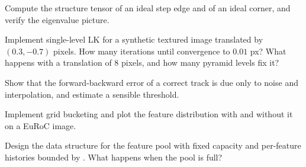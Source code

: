 \begin{exercises}
  \item Compute the structure tensor of an ideal step edge and of an ideal corner, and verify the eigenvalue picture.
  \item Implement single-level LK for a synthetic textured image translated by $(0.3, -0.7)$ pixels. How many iterations
        until convergence to $0.01$ px? What happens with a translation of 8 pixels, and how many pyramid levels fix it?
  \item Show that the forward-backward error of a correct track is due only to noise and interpolation, and estimate a
        sensible threshold.
  \item Implement grid bucketing and plot the feature distribution with and without it on a EuRoC image.
  \item Design the data structure for the feature pool with fixed capacity and per-feature histories bounded by
        . What happens when the pool is full?
\end{exercises}
